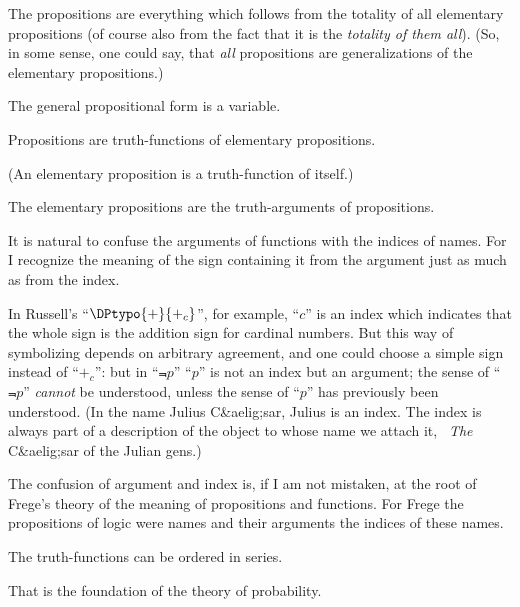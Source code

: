 {The propositions are everything which follows
from the totality of all elementary propositions (of
course also from the fact that it is the \emph{totality of
them all}). (So, in some sense, one could say, that
\emph{all} propositions are generalizations of the elementary
propositions.)}


{The general propositional form is a variable.}


{Propositions are truth-functions of elementary
propositions.

(An elementary proposition is a truth-function
of itself.)}


{The elementary propositions are the truth-arguments
of propositions.}


{It is natural to confuse the arguments of
functions with the indices of names. For I
recognize the meaning of the sign containing it
from the argument just as much as from the
index.

In Russell's ``$\DPtypo{+}{+_{c}}$'', for example, ``$c$'' is an
index which indicates that the whole sign is the
addition sign for cardinal numbers. But this way
of symbolizing depends on arbitrary agreement,
and one could choose a simple sign instead of
``$+_{c}$'': but in ``$\Not{p}$'' ``$p$'' is not an index but
an argument; the sense of ``$\Not{p}$'' \emph{cannot} be understood,
unless the sense of ``$p$'' has previously been
understood. (In the name Julius C&aelig;sar, Julius is
an index. The index is always part of a description
of the object to whose name we attach it, \exempliGratia\ \emph{The}
C&aelig;sar of the Julian gens.)

The confusion of argument and index is, if I
am not mistaken, at the root of Frege's theory
of the meaning of propositions and functions. For
Frege the propositions of logic were names and
their arguments the indices of these names.}


{The truth-functions can be ordered in
series.

That is the foundation of the theory of probability.}
\enlargethispage{-9pt} %

